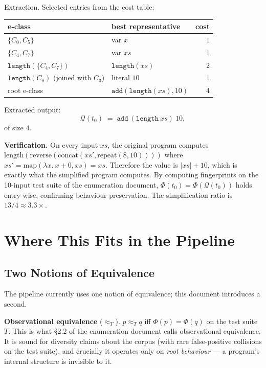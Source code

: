 \documentclass[11pt,a4paper]{article}
\begin{document}
Extraction. Selected entries from the cost table:

\begin{center}
\begin{tabular}{llr}
\toprule
e-class & best representative & cost \\
\midrule
$\{C_0, C_5\}$ & var $x$ & $1$ \\
$\{C_4, C_7\}$ & var $xs$ & $1$ \\
$\mathtt{length}(\{C_4, C_7\})$ & $\mathtt{length}(xs)$ & $2$ \\
$\mathtt{length}(C_8)$ (joined with $C_3$) & literal $10$ & $1$ \\
root e-class & $\mathtt{add}(\mathtt{length}(xs), 10)$ & $4$ \\
\bottomrule
\end{tabular}
\end{center}

Extracted output:
\[
  \mathcal{Q}(t_0) \;=\; \mathtt{add}\ (\mathtt{length}\ xs)\ 10,
\]
of size $4$.

\textbf{Verification.} On every input $xs$, the original program computes $\mathrm{length}(\mathrm{reverse}(\mathrm{concat}(xs', \mathrm{repeat}(8, 10))))$ where $xs' = \mathrm{map}(\lambda x.\ x + 0, xs) = xs$. Therefore the value is $|xs| + 10$, which is exactly what the simplified program computes. By computing fingerprints on the 10-input test suite of the enumeration document, $\Phi(t_0) = \Phi(\mathcal{Q}(t_0))$ holds entry-wise, confirming behaviour preservation. The simplification ratio is $13 / 4 \approx 3.3 \times$.

\section{Where This Fits in the Pipeline}\label{sec:fit}

\subsection{Two Notions of Equivalence}\label{sec:two-equivs}

The pipeline currently uses one notion of equivalence; this document introduces a second.

\textbf{Observational equivalence} ($\approx_T$). $p \approx_T q$ iff $\Phi(p) = \Phi(q)$ on the test suite $T$. This is what §2.2 of the enumeration document calls observational equivalence. It is sound for diversity claims about the corpus (with rare false-positive collisions on the test suite), and crucially it operates only on \emph{root behaviour} --- a program's internal structure is invisible to it.
\end{document}
